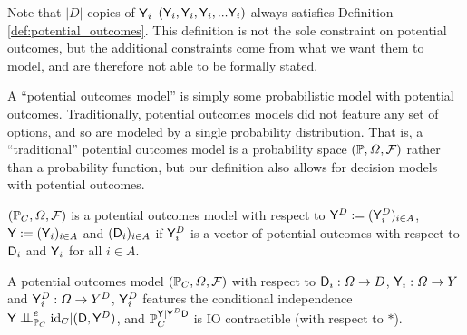 Note that $|D|$ copies of $\mathsf{Y}_i$ $(\mathsf{Y}_i,\mathsf{Y}_i,\mathsf{Y}_i,...\mathsf{Y}_i)$ always satisfies Definition \ref{def:potential_outcomes}. This definition is not the sole constraint on potential outcomes, but the additional constraints come from what we want them to model, and are therefore not able to be formally stated.

A ``potential outcomes model'' is simply some probabilistic model with potential outcomes. Traditionally, potential outcomes models did not feature any set of options, and so are modeled by a single probability distribution. That is, a ``traditional'' potential outcomes model is a probability space $(\mathbb{P},\Omega,\mathcal{F})$ rather than a probability function, but our definition also allows for decision models with potential outcomes.

\begin{definition}
$(\mathbb{P}_C,\Omega,\mathcal{F})$ is a potential outcomes model with respect to $\mathsf{Y}^D:=(\mathsf{Y}^D_i)_{i\in A}$, $\mathsf{Y}:=(\mathsf{Y}_i)_{i\in A}$ and $(\mathsf{D}_i)_{i\in A}$ if $\mathsf{Y}^D_i$ is a vector of potential outcomes with respect to $\mathsf{D}_i$ and $\mathsf{Y}_i$ for all $i\in A$.
\end{definition}

\begin{theorem}
A potential outcomes model $(\mathbb{P}_C,\Omega,\mathcal{F})$ with respect to $\mathsf{D}_i:\Omega\to D$, $\mathsf{Y}_i:\Omega\to Y$ and $\mathsf{Y}^D_i:\Omega\to Y^D$, $\mathsf{Y}^D_i$ features the conditional independence $\RV{Y}\CI_{\prob{P}_C}^e\text{id}_C|(\RV{D},\RV{Y}^D)$, and $\mathbb{P}_C^{\mathsf{Y}|\mathsf{Y}^D\mathsf{D}}$ is IO contractible (with respect to $*$).
\end{theorem}

